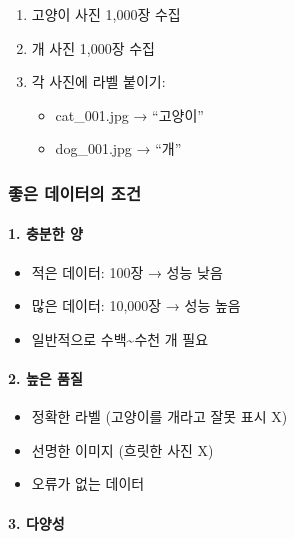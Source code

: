 \documentclass[a4paper, 11pt]{article}
\providecommand{\tightlist}{%
  \setlength{\itemsep}{0pt}\setlength{\parskip}{0pt}}
\begin{document}
\begin{enumerate}
\def\labelenumi{\arabic{enumi}.}
\tightlist
\item
  고양이 사진 1,000장 수집
\item
  개 사진 1,000장 수집
\item
  각 사진에 라벨 붙이기:

  \begin{itemize}
  \tightlist
  \item
    cat\_001.jpg → ``고양이''
  \item
    dog\_001.jpg → ``개''
  \end{itemize}
\end{enumerate}

\hypertarget{uxc88buxc740-uxb370uxc774uxd130uxc758-uxc870uxac74}{%
\subsubsection{좋은 데이터의
조건}\label{uxc88buxc740-uxb370uxc774uxd130uxc758-uxc870uxac74}}

\hypertarget{uxcda9uxbd84uxd55c-uxc591}{%
\paragraph{ 1. 충분한 양}\label{uxcda9uxbd84uxd55c-uxc591}}

\begin{itemize}
\tightlist
\item
  적은 데이터: 100장 → 성능 낮음
\item
  많은 데이터: 10,000장 → 성능 높음
\item
  일반적으로 수백\textasciitilde 수천 개 필요
\end{itemize}

\hypertarget{uxb192uxc740-uxd488uxc9c8}{%
\paragraph{ 2. 높은 품질}\label{uxb192uxc740-uxd488uxc9c8}}

\begin{itemize}
\tightlist
\item
  정확한 라벨 (고양이를 개라고 잘못 표시 X)
\item
  선명한 이미지 (흐릿한 사진 X)
\item
  오류가 없는 데이터
\end{itemize}

\hypertarget{uxb2e4uxc591uxc131}{%
\paragraph{ 3. 다양성}\label{uxb2e4uxc591uxc131}}
\end{document}
